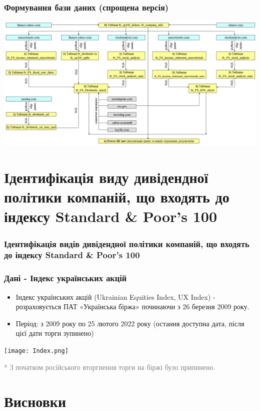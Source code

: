 \documentclass[aspectratio=169]{beamer}
\begin{document}
\begin{frame}
\frametitle{Формування бази даних (спрощена версія)}
\begin{center}
\includegraphics[scale=0.35]{Data Flow full.png}
\end{center}
\end{frame}

\section{Ідентифікація виду дивідендної політики компаній, що входять до індексу Standard \& Poor's 100}
\begin{frame}
\frametitle{Ідентифікація видів дивідендної політики компаній, що входять до індексу Standard \& Poor's 100}

\end{frame}

\begin{frame}
\frametitle{Дані - Індекс  українських  акцій}
\begin{center}
\begin{itemize}
\item \alert {Індекс  українських  акцій}  (Ukrainian  Equities  Index,  UX  Index) - розраховується ПАТ «Українська біржа» починаючи з 26 березня 2009 року.
\smallskip
\item  \alert {Період:} з 2009 року по 25 лютого 2022 року (остання доступна дата, після цієї дати 
торги  зупинено)
\end{itemize}
\tinyskip
\texttt{[image: Index.png]}
\tinyskip
\end{center}
\scriptsize \textcolor{gray}{* З  початком  російського  вторгнення  торги  на  біржі було  припинено.} 
\end{frame}

\section{Висновки}
\end{document}
